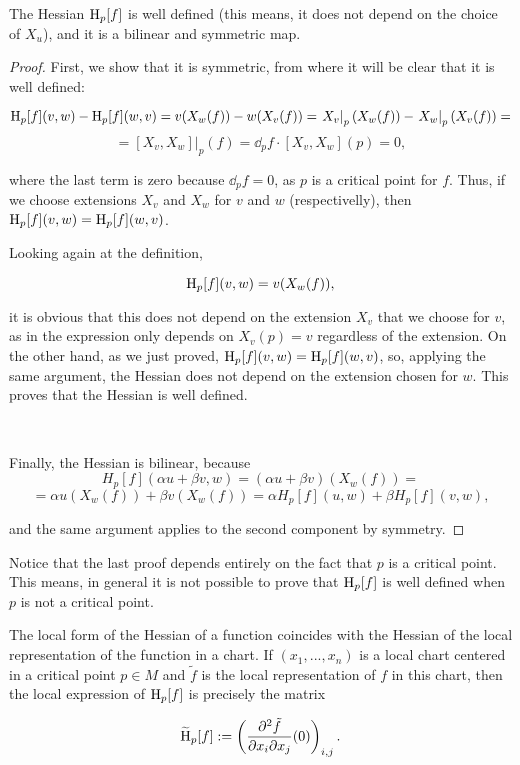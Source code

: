 \begin{lema}
	The Hessian $\operatorname H_p[f]$ is well defined (this means, it does not depend on the choice of $X_u$), and it is a bilinear and symmetric map.
\end{lema}

\begin{proof}
	First, we show that it is symmetric, from where it will be clear that it is well defined:

$$\operatorname H_p[f](v,w) - \operatorname H_p[f](w,v) = v(X_w(f)) - w(X_v(f)) = \left. X_v \right|_p(X_w(f)) - \left. X_w \right|_p (X_v(f)) = $$ 
$$= \left. [X_v,X_w] \right|_p(f) = \dd_p f \cdot [X_v,X_w](p) = 0 ,$$

where the last term is zero because $\dd_p f = 0$, as $p$ is a critical point for $f$. Thus, if we choose extensions $X_v$ and $X_w$ for $v$ and $w$ (respectivelly), then $\operatorname H_p[f](v,w) = \operatorname H_p[f](w,v)$.

Looking again at the definition,

$$\operatorname H_p[f](v,w) = v(X_w(f)),$$

it is obvious that this does not depend on the extension $X_v$ that we choose for $v$, as in the expression only depends on $X_v(p) = v$ regardless of the extension. On the other hand, as we just proved, $\operatorname H_p[f](v,w) = \operatorname H_p[f](w,v)$, so, applying the same argument, the Hessian does not depend on the extension chosen for $w$. This proves that the Hessian is well defined.

\

Finally, the Hessian is bilinear, because
$$H_p[f](\alpha u + \beta v, w) = (\alpha u + \beta v)(X_w(f)) = $$
$$= \alpha u(X_w(f)) + \beta v(X_w(f)) = \alpha H_p[f](u,w) + \beta H_p[f](v,w) ,$$

and the same argument applies to the second component by symmetry.
\end{proof}

Notice that the last proof depends entirely on the fact that $p$ is a critical point. This means, in general it is not possible to prove that $\operatorname H_p[f]$ is well defined when $p$ is not a critical point.

\begin{rmrk}
	The local form of the Hessian of a function coincides with the Hessian of the local representation of the function in a chart. If $(x_1,...,x_n)$ is a local chart centered in a critical point $p \in M$ and $\tilde{f}$ is the local representation of $f$ in this chart, then the local expression of $\operatorname H_p[f]$ is precisely the matrix

\begin{displaymath}
	\widetilde{\operatorname H}_p[f] := \left( \frac{\partial^2 \tilde{f}}{\partial x_i \partial x_j}(0) \right)_{i,j} .
\end{displaymath}
\end{rmrk}

